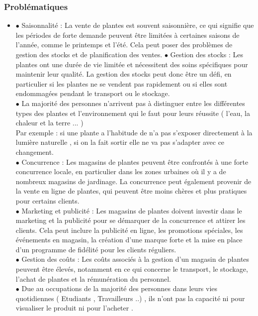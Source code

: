 \documentclass[a4paper,12pt,oneside]{article}
\begin{document}
\subsubsection{Problématiques}
\begin{itemize}
\item[]
       	 $\bullet$ Saisonnalité : La vente de plantes est souvent
saisonnière, ce qui signifie que les périodes de
forte demande peuvent être limitées à
certaines saisons de l'année, comme le
printemps et l'été. Cela peut poser des
problèmes de gestion des stocks et de
planification des ventes.
\vskip1mm
       	 $\bullet$ Gestion des stocks : Les plantes ont une durée
de vie limitée et nécessitent des soins
spécifiques pour maintenir leur qualité. La
gestion des stocks peut donc être un défi, en
particulier si les plantes ne se vendent pas
rapidement ou si elles sont endommagées
pendant le transport ou le stockage.\\
\vskip1mm
       	 $\bullet$ La majorité des personnes n'arrivent pas à
distinguer entre les différentes types des
plantes et l'environnement qui le faut pour
leurs réussite ( l'eau, la chaleur et la terre ... )\\
Par exemple : si une plante a l'habitude de n'a pas
s'exposer directement à la lumière naturelle , si on
la fait sortir elle ne va pas s'adapter avec ce
changement.\\
\vskip1mm
    		$\bullet$ Concurrence : Les magasins de plantes peuvent
être confrontés à une forte concurrence locale,
en particulier dans les zones urbaines où il y a
de nombreux magasins de jardinage. La
concurrence peut également provenir de la
vente en ligne de plantes, qui peuvent être
moins chères et plus pratiques pour certains
clients. \\
\vskip1mm
    		$\bullet$ Marketing et publicité : Les magasins de
plantes doivent investir dans le marketing et la
publicité pour se démarquer de la concurrence
et attirer les clients. Cela peut inclure la
publicité en ligne, les promotions spéciales, les
événements en magasin, la création d'une
marque forte et la mise en place d'un
programme de fidélité pour les clients
réguliers.\\
\vskip1mm
    		$\bullet$ Gestion des coûts : Les coûts associés à la
gestion d'un magasin de plantes peuvent être
élevés, notamment en ce qui concerne le
transport, le stockage, l'achat de plantes et la
rémunération du personnel.\\
\vskip1mm
    		$\bullet$ Due au occupations de la majorité des
personnes dans leurs vies quotidiennes (
Etudiants , Travailleurs ..) , ils n'ont pas la
capacité ni pour visualiser le produit ni pour
l'acheter .
    		
\end{itemize}
\end{document}
